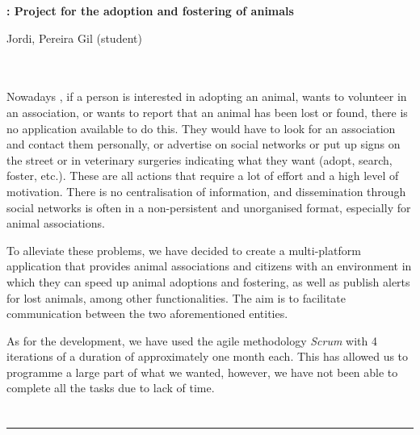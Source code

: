 \thispagestyle{empty}


\begin{center}
{\large\bfseries \myTitle: Project for the adoption and fostering of animals}\\
\end{center}
\begin{center}
Jordi, Pereira Gil (student)\\
\end{center}

\\

\vspace{0.7cm}
\\

Nowadays , if a person is interested in adopting an animal, wants to volunteer in an association, or wants to report that an animal has been lost or found, there is no application available to do this. They would have to look for an association and contact them personally, or advertise on social networks or put up signs on the street or in veterinary surgeries indicating what they want (adopt, search, foster, etc.). These are all actions that require a lot of effort and a high level of motivation. There is no centralisation of information, and dissemination through social networks is often in a non-persistent and unorganised format, especially for animal associations.

To alleviate these problems, we have decided to create a multi-platform application that provides animal associations and citizens with an environment in which they can speed up animal adoptions and fostering, as well as publish alerts for lost animals, among other functionalities. The aim is to facilitate communication between the two aforementioned entities.

As for the development, we have used the agile methodology \textit{Scrum} with 4 iterations of a duration of approximately one month each. This has allowed us to programme a large part of what we wanted, however, we have not been able to complete all the tasks due to lack of time.

\chapter*{}
\thispagestyle{empty}

\noindent\rule[-1ex]{\textwidth}{2pt}\\[4.5ex]

